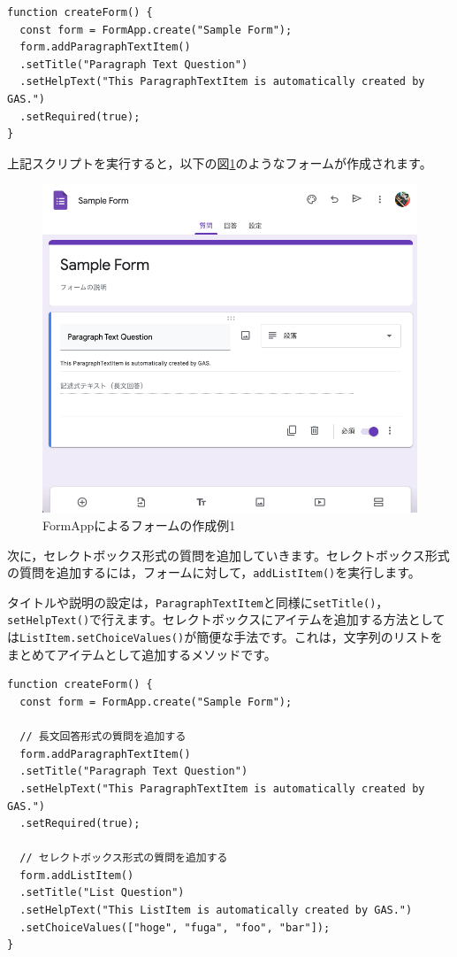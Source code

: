 \documentclass[uplatex,a4j]{jsarticle}
\begin{document}
\begin{lstlisting}[basicstyle=\ttfamily\footnotesize,frame=single,caption=FormApp sample 4]
function createForm() {
  const form = FormApp.create("Sample Form");
  form.addParagraphTextItem()
  .setTitle("Paragraph Text Question")
  .setHelpText("This ParagraphTextItem is automatically created by GAS.")
  .setRequired(true);
}
\end{lstlisting}

上記スクリプトを実行すると，以下の図\ref{fig:form_sample1}のようなフォームが作成されます。

\begin{figure}[H]
 \centering
 \includegraphics[keepaspectratio, scale=0.5]{images/form_sample1.png}
 \caption{FormAppによるフォームの作成例1}
 \label{fig:form_sample1}
\end{figure}

次に，セレクトボックス形式の質問を追加していきます。セレクトボックス形式の質問を追加するには，フォームに対して，\verb|addListItem()|を実行します。


タイトルや説明の設定は，\verb|ParagraphTextItem|と同様に\verb|setTitle()|，\verb|setHelpText()|で行えます。セレクトボックスにアイテムを追加する方法としては\verb|ListItem.setChoiceValues()|が簡便な手法です。これは，文字列のリストをまとめてアイテムとして追加するメソッドです。

\begin{lstlisting}[basicstyle=\ttfamily\footnotesize,frame=single,caption=FormApp sample 5]
function createForm() {
  const form = FormApp.create("Sample Form");
  
  // 長文回答形式の質問を追加する
  form.addParagraphTextItem()
  .setTitle("Paragraph Text Question")
  .setHelpText("This ParagraphTextItem is automatically created by GAS.")
  .setRequired(true);
  
  // セレクトボックス形式の質問を追加する
  form.addListItem()
  .setTitle("List Question")
  .setHelpText("This ListItem is automatically created by GAS.")
  .setChoiceValues(["hoge", "fuga", "foo", "bar"]);
}
\end{lstlisting}
\end{document}
